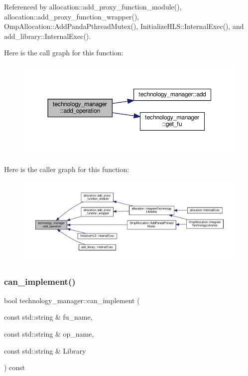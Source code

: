 Referenced by allocation\+::add\+\_\+proxy\+\_\+function\+\_\+module(), allocation\+::add\+\_\+proxy\+\_\+function\+\_\+wrapper(), Omp\+Allocation\+::\+Add\+Panda\+Pthread\+Mutex(), Initialize\+H\+L\+S\+::\+Internal\+Exec(), and add\+\_\+library\+::\+Internal\+Exec().

Here is the call graph for this function\+:
\nopagebreak
\begin{figure}[H]
\begin{center}
\leavevmode
\includegraphics[width=350pt]{df/dc7/classtechnology__manager_a2a5555fe0295bf0881902f5fd2730c0b_cgraph}
\end{center}
\end{figure}
Here is the caller graph for this function\+:
\nopagebreak
\begin{figure}[H]
\begin{center}
\leavevmode
\includegraphics[width=350pt]{df/dc7/classtechnology__manager_a2a5555fe0295bf0881902f5fd2730c0b_icgraph}
\end{center}
\end{figure}
\mbox{\label{classtechnology__manager_ae2841df8f1c076ccb3ba874e271fc7a5}} 
\subsubsection{\texorpdfstring{can\+\_\+implement()}{can\_implement()}}
{\footnotesize\ttfamily bool technology\+\_\+manager\+::can\+\_\+implement (\begin{DoxyParamCaption}\item[{const std\+::string \&}]{fu\+\_\+name,  }\item[{const std\+::string \&}]{op\+\_\+name,  }\item[{const std\+::string \&}]{Library }\end{DoxyParamCaption}) const}



